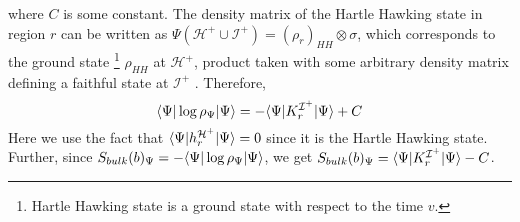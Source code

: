 \documentclass[12pt]{article}
\DeclarePairedDelimiter\bra{\langle}{\rvert}
\DeclarePairedDelimiter\ket{\lvert}{\rangle}
\begin{document}
where $C$ is some constant. The density matrix of the Hartle Hawking  state in region $r$ can be written as $\Psi(\mathcal{H^+}\cup \mathcal{I^+})= (\rho_r)_{HH}\otimes \sigma$, which corresponds to the ground state \footnote{Hartle Hawking state is a ground state with respect to the time $v$.} $\rho_{HH}$ at $\mathcal{H^+}$, product taken with some arbitrary density matrix defining a faithful state at $\mathcal{I^+}$ \cite{AW}. Therefore,
\begin{equation}\label{II20a}
\bra{\Psi}\log{\rho_{\Psi}}\ket{\Psi}= -\bra{\Psi}K_r^{\mathcal{I^+}}\ket{\Psi}+C
\end{equation}
Here we use the fact that $\bra{\Psi} h_r^{\mathcal{H^+}}\ket{\Psi}=0$ since it is the Hartle Hawking state. Further,  since $S_{bulk}(b)_{\Psi}=- \bra{\Psi}\log{\rho_{\Psi}}\ket{\Psi}$, we get $S_{bulk}(b)_{\Psi}= \bra{\Psi}K_r^{\mathcal{I^+}}\ket{\Psi}-C$.
\end{document}
